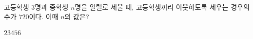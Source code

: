 고등학생 $3$명과 중학생 $n$명을 일렬로 세울 때, 고등학생끼리 이웃하도록 세우는 경우의 수가 $720$이다. 이때 $n$의 값은?
\begin{choices32}{$2$}{$3$}{$4$}{$5$}{$6$}\end{choices32}
